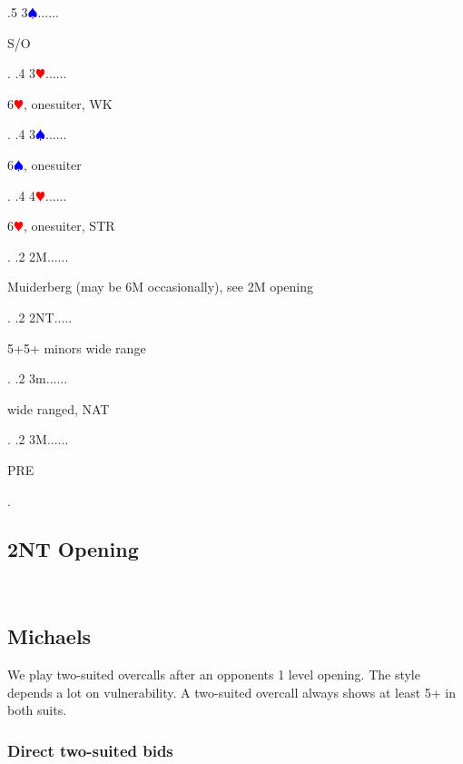 \documentclass[a4paper]{article}
\newcommand{\BH}{\textcolor{Red}{$\varheartsuit${}}}
\newcommand{\BS}{\textcolor{Blue}{$\spadesuit${}}}
\begin{document}
{ .5 3\BS......\begin{minipage}[t]{0.8\textwidth}
S/O
\end{minipage}. 
 .4 3\BH......\begin{minipage}[t]{0.8\textwidth}
6\BH , onesuiter, WK
\end{minipage}. 
 .4 3\BS......\begin{minipage}[t]{0.8\textwidth}
6\BS , onesuiter
\end{minipage}. 
 .4 4\BH......\begin{minipage}[t]{0.8\textwidth}
6\BH , onesuiter, STR
\end{minipage}. 
 .2 2M......\begin{minipage}[t]{0.8\textwidth}
Muiderberg (may be 6M occasionally), see 2M opening
\end{minipage}. 
 .2 2NT.....\begin{minipage}[t]{0.8\textwidth}
5+5+ minors wide range
\end{minipage}. 
 .2 3m......\begin{minipage}[t]{0.8\textwidth}
wide ranged, NAT
\end{minipage}. 
 .2 3M......\begin{minipage}[t]{0.8\textwidth}
PRE
\end{minipage}. 
}
\bigbreak
\subsection{2NT Opening}

\
\bigbreak
\subsection{Michaels}

We play two-suited overcalls after an opponents 1 level opening. The style
depends a lot on vulnerability. A two-suited overcall always shows at least 5+
in both suits.
\bigbreak
\subsubsection{Direct two-suited bids}
\end{document}
